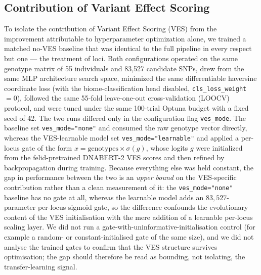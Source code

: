 \documentclass[twocolumn,10pt]{article}
\begin{document}
\subsection{Contribution of Variant Effect Scoring}
To isolate the contribution of Variant Effect Scoring (VES) from the improvement attributable to
hyperparameter optimization alone, we trained a matched no-VES baseline that was identical to the
full pipeline in every respect but one --- the treatment of loci. Both configurations operated on
the same genotype matrix of 55 individuals and 83{,}527 candidate SNPs, drew from the same MLP
architecture search space, minimized the same differentiable haversine coordinate loss (with the
biome-classification head disabled, \texttt{cls\_loss\_weight}~$=0$), followed the same 55-fold
leave-one-out cross-validation (LOOCV) protocol, and were tuned under the same 100-trial Optuna
budget with a fixed seed of 42. The two runs differed only in the configuration flag
\texttt{ves\_mode}. The baseline set \texttt{ves\_mode="none"} and consumed the raw genotype vector
directly, whereas the VES-learnable model set \texttt{ves\_mode="learnable"} and applied a per-locus
gate of the form $x = \text{genotypes} \times \sigma(g)$, whose logits $g$ were initialized from the
felid-pretrained DNABERT-2 \citep{zhou2024dnabert} VES scores and then refined by backpropagation
during training. Because everything else was held constant, the gap in performance between the two
is an \emph{upper bound} on the VES-specific contribution rather than a clean measurement of it: the
\texttt{ves\_mode="none"} baseline has no gate at all, whereas the learnable model adds an
$83{,}527$-parameter per-locus sigmoid gate, so the difference confounds the evolutionary content of
the VES initialisation with the mere addition of a learnable per-locus scaling layer. We did not run
a gate-with-uninformative-initialisation control (for example a random- or constant-initialised gate
of the same size), and we did not analyse the trained gates to confirm that the VES structure
survives optimisation; the gap should therefore be read as bounding, not isolating, the
transfer-learning signal.
\end{document}
